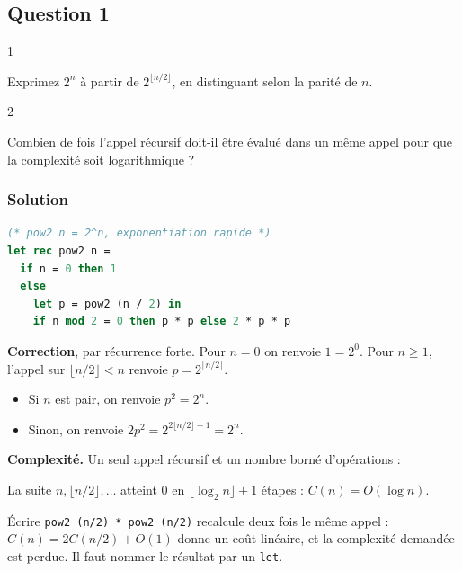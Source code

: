 \documentclass[11pt,a4paper]{article}
\providecommand{\tightlist}{\setlength{\itemsep}{0pt}\setlength{\parskip}{0pt}}
\newcommand{\equationajustee}[1]{%
  \sbox{\boiteequation}{$\displaystyle #1$}%
  \ifdim\wd\boiteequation>\linewidth
    \[\resizebox{\linewidth}{!}{\usebox{\boiteequation}}\]%
  \else
    \[#1\]%
  \fi}
\begin{document}
\hypertarget{question-1}{%
\subsection{Question 1}\label{question-1}}

\begin{indication}{1}

Exprimez \(2^n\) à partir de \(2^{\lfloor n/2\rfloor}\), en distinguant selon la parité de \(n\).

\end{indication}

\begin{indication}{2}

Combien de fois l'appel récursif doit-il être évalué dans un même appel pour que la complexité soit logarithmique ?

\end{indication}

\hypertarget{solution}{%
\subsubsection{Solution}\label{solution}}

\begin{lstlisting}[language=Caml]
(* pow2 n = 2^n, exponentiation rapide *)
let rec pow2 n =
  if n = 0 then 1
  else
    let p = pow2 (n / 2) in
    if n mod 2 = 0 then p * p else 2 * p * p
\end{lstlisting}

\textbf{Correction}, par récurrence forte. Pour \(n=0\) on renvoie \(1=2^0\). Pour \(n\ge1\), l'appel sur \(\lfloor n/2\rfloor<n\) renvoie \(p=2^{\lfloor n/2\rfloor}\).

\begin{itemize}
\tightlist
\item
  Si \(n\) est pair, on renvoie \(p^2=2^n\).
\item
  Sinon, on renvoie \(2p^2=2^{2\lfloor n/2\rfloor+1}=2^n\).
\end{itemize}

\textbf{Complexité.} Un seul appel récursif et un nombre borné d'opérations :

\equationajustee{C(n)=C(\lfloor n/2\rfloor)+O(1).}

La suite \(n,\lfloor n/2\rfloor,\dots\) atteint \(0\) en \(\lfloor\log_2 n\rfloor+1\) étapes : \(C(n)=O(\log n)\).

\begin{piege}

Écrire \texttt{pow2\ (\allowbreak{}n/\allowbreak{}2)\allowbreak{}\ *\ pow2\ (\allowbreak{}n/\allowbreak{}2)\allowbreak{}} recalcule deux fois le même appel : \(C(n)=2C(n/2)+O(1)\) donne un coût linéaire, et la complexité demandée est perdue. Il faut nommer le résultat par un \texttt{let}.

\end{piege}
\end{document}
